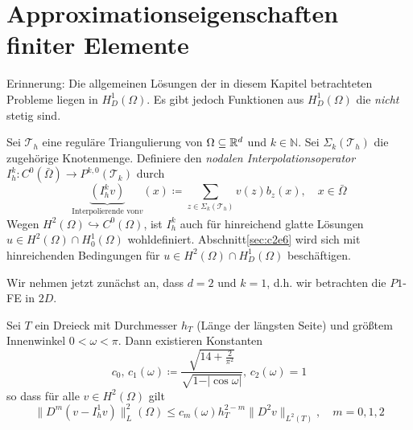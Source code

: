 \documentclass[../skript.tex]{subfiles}
\begin{document}
\section{Approximationseigenschaften finiter Elemente}\label{sec:c2e5}

Erinnerung: Die allgemeinen Lösungen der in diesem Kapitel betrachteten Probleme liegen in $H^1_D(\Omega)$. Es gibt jedoch Funktionen aus $H^1_D(\Omega)$ die \emph{nicht} stetig sind.

\begin{definition}\label{def:c2e5s1}
	Sei $\mathcal{T}_h$ eine reguläre Triangulierung von $\Omega\subseteq\mathbb{R}^d$ und $k\in\mathbb{N}$. Sei $\Sigma_k(\mathcal{T}_h)$ die zugehörige Knotenmenge. Definiere den \emph{nodalen Interpolationsoperator} $I_h^k:C^0(\bar{\Omega})\to P^{k,0}(\mathcal{T}_k)$ durch 
	\[
		\underbrace{(I_h^k v)}_{\text{Interpolierende von} v}(x) \coloneqq \sum_{z\in \Sigma_k(\mathcal{T}_h)} v(z)b_z(x),\quad x\in\bar{\Omega}
	\]  
	Wegen $H^2(\Omega)\hookrightarrow C^0(\Omega)$, ist $I_h^k$ auch für hinreichend glatte Lösungen $u\in H^2(\Omega)\cap H^1_0(\Omega)$ wohldefiniert. Abschnitt\cref{sec:c2e6} wird sich mit hinreichenden Bedingungen für $u\in H^2(\Omega)\cap H^1_D(\Omega)$ beschäftigen.
\end{definition}
Wir nehmen jetzt zunächst an, dass $d=2$ und $k=1$, d.h. wir betrachten die $P1$-FE in $2D$.
\begin{theorem}[Interpolationsfehlerabschätzung]\label{thm:c2e5s2}
	Sei $T$ ein Dreieck mit Durchmesser $h_T$ (Länge der längsten Seite) und größtem Innenwinkel $0 < \omega < \pi$. Dann existieren Konstanten 
	\[
		c_0,\,c_1(\omega)\coloneqq\frac{\sqrt{{1}{4}+\frac{2}{\pi^2}}}{\sqrt{1-\vert\cos{\omega}\vert}},\, c_2(\omega) = 1
	\]
	so dass für alle $v\in H^2(\Omega)$ gilt
	\[
		\| D^m(v-I_h^1 v)\|_L^2(\Omega) \leq c_m(\omega)h_T^{2-m}\| D^2 v\|_{L^2(T)},\quad m=0,1,2
	\]
\end{theorem}
\end{document}
